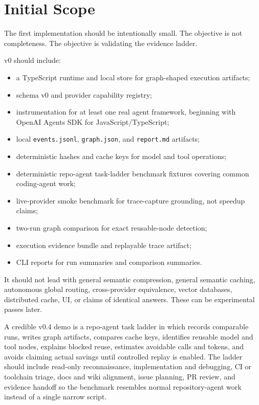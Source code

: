\section{Initial Scope}

The first implementation should be intentionally small. The objective is not completeness. The objective is validating the evidence ladder.

\migaki{} v0 should include:

\begin{itemize}[leftmargin=1.5em]
  \item a TypeScript runtime and local store for graph-shaped execution artifacts;
  \item \mir{} schema v0 and provider capability registry;
  \item instrumentation for at least one real agent framework, beginning with OpenAI Agents SDK for JavaScript/TypeScript;
  \item local \texttt{events.jsonl}, \texttt{graph.json}, and \texttt{report.md} artifacts;
  \item deterministic hashes and cache keys for model and tool operations;
  \item deterministic repo-agent task-ladder benchmark fixtures covering common coding-agent work;
  \item live-provider smoke benchmark for trace-capture grounding, not speedup claims;
  \item two-run graph comparison for exact reusable-node detection;
  \item execution evidence bundle and replayable trace artifact;
  \item CLI reports for run summaries and comparison summaries.
\end{itemize}

It should not lead with general semantic compression, general semantic caching, autonomous global routing, cross-provider equivalence, vector databases, distributed cache, UI, or claims of identical answers. These can be experimental passes later.

A credible v0.4 demo is a repo-agent task ladder in which \migaki{} records comparable runs, writes graph artifacts, compares cache keys, identifies reusable model and tool nodes, explains blocked reuse, estimates avoidable calls and tokens, and avoids claiming actual savings until controlled replay is enabled. The ladder should include read-only reconnaissance, implementation and debugging, CI or toolchain triage, docs and wiki alignment, issue planning, PR review, and evidence handoff so the benchmark resembles normal repository-agent work instead of a single narrow script.

